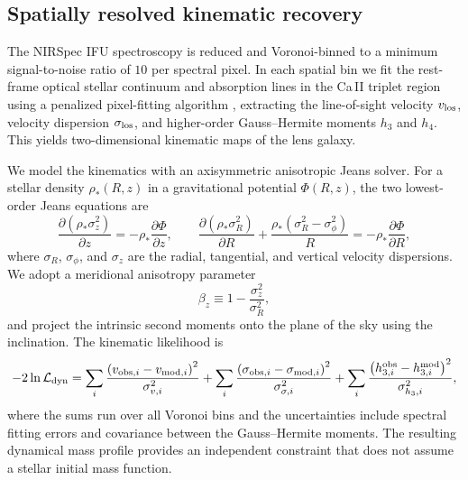 \documentclass{article}
\begin{document}
\subsection{Spatially resolved kinematic recovery}
The NIRSpec IFU spectroscopy is reduced and Voronoi-binned to a minimum signal-to-noise ratio of \(10\) per spectral pixel. In each spatial bin we fit the rest-frame optical stellar continuum and absorption lines in the Ca\,II triplet region using a penalized pixel-fitting algorithm \cite{Cappellari2008}, extracting the line-of-sight velocity \(v_{\rm los}\), velocity dispersion \(\sigma_{\rm los}\), and higher-order Gauss--Hermite moments \(h_3\) and \(h_4\). This yields two-dimensional kinematic maps of the lens galaxy.

We model the kinematics with an axisymmetric anisotropic Jeans solver. For a stellar density \(\rho_*(R,z)\) in a gravitational potential \(\Phi(R,z)\), the two lowest-order Jeans equations are
\begin{equation}
\frac{\partial \left(\rho_* \sigma_z^2\right)}{\partial z}
= -\rho_* \frac{\partial \Phi}{\partial z},
\qquad
\frac{\partial \left(\rho_* \sigma_R^2\right)}{\partial R}
+ \frac{\rho_* \left(\sigma_R^2 - \sigma_\phi^2\right)}{R}
= -\rho_* \frac{\partial \Phi}{\partial R},
\label{eq:jeans}
\end{equation}
where \(\sigma_R\), \(\sigma_\phi\), and \(\sigma_z\) are the radial, tangential, and vertical velocity dispersions. We adopt a meridional anisotropy parameter
\begin{equation}
\beta_z \equiv 1 - \frac{\sigma_z^2}{\sigma_R^2},
\label{eq:anisotropy}
\end{equation}
and project the intrinsic second moments onto the plane of the sky using the inclination. The kinematic likelihood is
\begin{equation}
-2\ln \mathcal{L}_{\rm dyn} =
\sum_{i} \frac{\left(v_{{\rm obs},i} - v_{{\rm mod},i}\right)^2}{\sigma_{v,i}^2}
+ \sum_{i} \frac{\left(\sigma_{{\rm obs},i} - \sigma_{{\rm mod},i}\right)^2}{\sigma_{\sigma,i}^2}
+ \sum_{i} \frac{\left(h_{3,i}^{\rm obs} - h_{3,i}^{\rm mod}\right)^2}{\sigma_{h_3,i}^2},
\label{eq:dyn_likelihood}
\end{equation}
where the sums run over all Voronoi bins and the uncertainties include spectral fitting errors and covariance between the Gauss--Hermite moments. The resulting dynamical mass profile provides an independent constraint that does not assume a stellar initial mass function.
\end{document}
